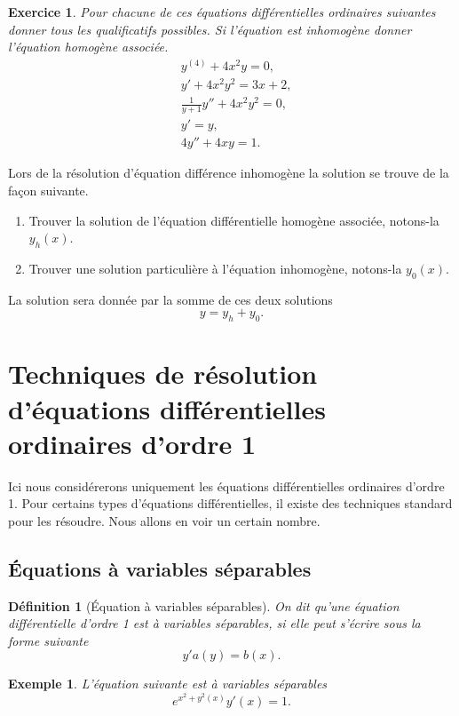 \documentclass[a4paper,12pt]{book}
\newtheorem{definition}{Définition}
\newtheorem*{exemple}{Exemple}
\newtheorem*{exercice}{Exercice}
\begin{document}
\begin{exercice}
 Pour chacune de ces équations différentielles ordinaires suivantes donner tous les qualificatifs possibles.
 Si l'équation est inhomogène donner l'équation homogène associée.
 \begin{align}
  &y^{(4)}+4x^2 y=0,\\
  &y'+4x^2 y^2=3x+2,\\
  &\frac{1}{y+1}y''+4x^2 y^2=0,\\
  &y'=y,\\
  &4y''+4x y=1.
 \end{align}
\end{exercice}
Lors de la résolution d'équation différence inhomogène la solution se trouve de la façon suivante.
\begin{enumerate}
 \item Trouver la solution de l'équation différentielle homogène associée, notons-la $y_h(x)$.
 \item Trouver une solution particulière à l'équation inhomogène, notons-la $y_0(x)$.
\end{enumerate}
La solution sera donnée par la somme de ces deux solutions
\begin{equation}
 y=y_h+y_0.
\end{equation}



\section{Techniques de résolution d'équations différentielles ordinaires d'ordre 1}

Ici nous considérerons uniquement les équations différentielles ordinaires d'ordre 1. 
Pour certains types d'équations différentielles, il existe des techniques standard pour 
les résoudre. Nous allons en voir un certain nombre.

\subsection{Équations à variables séparables}

\begin{definition}[Équation à variables séparables]
On dit qu'une équation différentielle d'ordre 1 est à variables séparables, si elle peut s'écrire sous la forme suivante
\begin{equation}
 y' a(y)=b(x).
\end{equation}
\end{definition}
\begin{exemple}
 L'équation suivante est à variables séparables
 \begin{equation}
  e^{x^2+y^2(x)}y'(x)=1.
 \end{equation}

\end{exemple}
\end{document}
